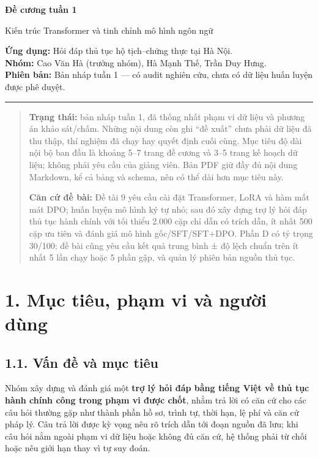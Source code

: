 \documentclass[11pt,a4paper]{article}
\begin{document}
{\LARGE\bfseries Đề cương tuần 1\par}
\vspace{4pt}
{\large Kiến trúc Transformer và tinh chỉnh mô hình ngôn ngữ\par}
\vspace{4pt}
\textbf{Ứng dụng:} Hỏi đáp thủ tục hộ tịch–chứng thực tại Hà Nội.\\
\textbf{Nhóm:} Cao Văn Hà (trưởng nhóm), Hà Mạnh Thế, Trần Duy Hưng.\\
\textbf{Phiên bản:} Bản nháp tuần 1 — có audit nghiên cứu, chưa có dữ liệu huấn luyện được phê duyệt.
\vspace{5pt}\hrule\vspace{8pt}
\begin{quote}
\textbf{Trạng thái:} bản nháp tuần 1, đã thống nhất phạm vi dữ liệu và
phương án khảo sát/chấm. Những nội dung còn ghi ``đề xuất'' chưa phải dữ
liệu đã thu thập, thí nghiệm đã chạy hay quyết định cuối cùng. Mục tiêu
độ dài nội bộ ban đầu là khoảng 5--7 trang đề cương và 3--5 trang kế
hoạch dữ liệu; không phải yêu cầu của giảng viên. Bản PDF giữ đầy đủ nội
dung Markdown, kể cả bảng và schema, nên có thể dài hơn mục tiêu này.

\textbf{Căn cứ đề bài:} Đề tài 9 yêu cầu cài đặt Transformer, LoRA và
hàm mất mát DPO; huấn luyện mô hình ký tự nhỏ; sau đó xây dựng trợ lý
hỏi đáp thủ tục hành chính với tối thiểu 2.000 cặp chỉ dẫn có trích dẫn,
ít nhất 500 cặp ưu tiên và đánh giá mô hình gốc/SFT/SFT+DPO. Phần D có
tỷ trọng 30/100; đề bài cũng yêu cầu kết quả trung bình ± độ lệch chuẩn
trên ít nhất 5 lần chạy hoặc 5 phần gập, và quản lý phiên bản nguồn thủ
tục.
\end{quote}

\section{1. Mục tiêu, phạm vi và người
dùng}\label{mux1ee5c-tiuxeau-phux1ea1m-vi-vuxe0-ngux1b0ux1eddi-duxf9ng}

\subsection{1.1. Vấn đề và mục
tiêu}\label{vux1ea5n-ux111ux1ec1-vuxe0-mux1ee5c-tiuxeau}

Nhóm xây dựng và đánh giá một \textbf{trợ lý hỏi đáp bằng tiếng Việt về
thủ tục hành chính công trong phạm vi được chốt}, nhằm trả lời có căn cứ
cho các câu hỏi thường gặp như thành phần hồ sơ, trình tự, thời hạn, lệ
phí và căn cứ pháp lý. Câu trả lời được kỳ vọng nêu rõ trích dẫn tới
đoạn nguồn đã lưu; khi câu hỏi nằm ngoài phạm vi dữ liệu hoặc không đủ
căn cứ, hệ thống phải từ chối hoặc nêu giới hạn thay vì tự suy đoán.
\end{document}
